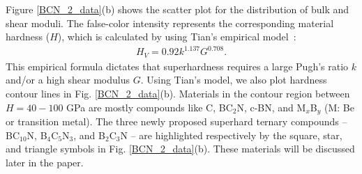 	Figure \ref{BCN_2_data}(b) shows the scatter plot for the distribution of bulk and shear moduli. The false-color intensity represents the corresponding material hardness ($H$), which is calculated by using Tian's empirical model~\cite{tian2012microscopic}:
	\begin{equation}
		\label{eq:Tian}
		\begin{aligned}
			H_V = 0.92k^{1.137}G^{0.708}.
		\end{aligned}
	\end{equation}
	This empirical formula dictates that superhardness requires a large Pugh's ratio $k$ and/or a high shear modulus $G$.
	Using Tian's model, we also plot hardness contour lines in Fig. \ref{BCN_2_data}(b). Materials in the contour region between $H= 40 - 100$ GPa are mostly compounds like C, BC$_2$N, c-BN, and M$_x$B$_y$ (M: Be or transition metal). The three newly proposed superhard ternary compounds -- BC$_{10}$N, B$_4$C$_5$N$_3$, and B$_2$C$_3$N -- are highlighted respectively by the square, star, and triangle symbols in Fig. \ref{BCN_2_data}(b). These materials will be discussed later in the paper.

